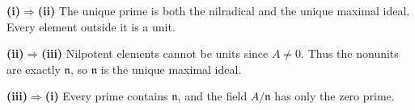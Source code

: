 \textbf{(i)$\Rightarrow$(ii)} The unique prime is both the nilradical and the unique maximal ideal. Every element outside it is a unit.

\textbf{(ii)$\Rightarrow$(iii)} Nilpotent elements cannot be units since $A\ne0$. Thus the nonunits are exactly $\mathfrak n$, so $\mathfrak n$ is the unique maximal ideal.

\textbf{(iii)$\Rightarrow$(i)} Every prime contains $\mathfrak n$, and the field $A/\mathfrak n$ has only the zero prime.
